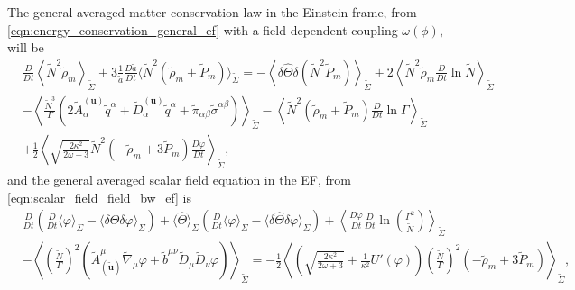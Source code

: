 The general averaged matter conservation law in the Einstein frame, from \cref{eqn:energy_conservation_general_ef} with a field dependent coupling $\omega(\phi)$, will be
\begin{align}
    &\frac{D}{Dt}\left\langle \tilde{N}^2\tilde{\rho}_m\right\rangle_{\tilde{\Sigma}}+3\frac{1}{\tilde{a}}\frac{D\tilde{a}}{Dt}\langle \tilde{N}^2(\tilde{\rho}_m+\tilde{P}_m)\rangle_{\tilde{\Sigma}}=-\left\langle\delta\hat{\Theta}\delta(\tilde{N}^2\tilde{P}_m)\right\rangle_{\tilde{\Sigma}}+2\left\langle \tilde{N}^2\tilde{\rho}_m \frac{D}{Dt}\ln\tilde{N}\right\rangle_{\tilde{\Sigma}}\nonumber\\
    &-\left\langle \frac{\tilde{N}^3}{\Gamma}\left(2\tilde{A}^{(\mathbf{u})}_\alpha \tilde{q}^\alpha+\tilde{D}^{(\mathbf{u})}_\alpha \tilde{q}^\alpha+\tilde{\pi}_{\alpha\beta}\tilde{\sigma}^{\alpha\beta}\right)\right\rangle_{\tilde{\Sigma}}-\left\langle\tilde{N}^2(\tilde{\rho}_m+\tilde{P}_m)\frac{D}{Dt}\ln\Gamma\right\rangle_{\tilde{\Sigma}}\nonumber\\
    &+\frac{1}{2}\left\langle \sqrt{\frac{2\kappa^2}{2\omega+3}}\tilde{N}^2(-\tilde{\rho}_m+3\tilde{P}_m)\frac{D\varphi}{Dt}\right\rangle_{\tilde{\Sigma}},
    \label{eqn:energy_conservation_general_bw_ef}
\end{align}
and the general averaged scalar field equation in the EF, from \cref{eqn:scalar_field_field_bw_ef} is
\begin{align}
    &\frac{D}{Dt}\left(\frac{D}{Dt}\langle\varphi\rangle_{\tilde{\Sigma}}-\langle\delta\hat{\Theta}\delta\varphi\rangle_{\tilde{\Sigma}}\right)+\langle\hat{\Theta}\rangle_{\tilde{\Sigma}} \left(\frac{D}{Dt}\langle\varphi\rangle_{\tilde{\Sigma}}-\langle\delta\hat{\Theta}\delta\varphi\rangle_{\tilde{\Sigma}}\right) +\left\langle\frac{D\varphi}{Dt}\frac{D}{Dt}\ln\left(\frac{\Gamma^2}{\tilde{N}}\right)\right\rangle_{\tilde{\Sigma}}\\
    &-\left\langle\left(\frac{\tilde{N}}{\Gamma}\right)^2\left(\tilde{A}^\mu_{(\mathbf{\tilde{u}})} \tilde{\nabla}_\mu\varphi+\tilde{b}^{\mu\nu}\tilde{D}_\mu\tilde{D}_\nu \varphi\right) \right\rangle_{\tilde{\Sigma}}=-\frac{1}{2}\left\langle\left(\sqrt{\frac{2\kappa^2}{2\omega+3}}+\frac{1}{\kappa^2}U'(\varphi)\right)\left(\frac{\tilde{N}}{\Gamma}\right)^2(-\tilde{\rho}_m+3\tilde{P}_m)\right\rangle_{\tilde{\Sigma}},\nonumber
    \label{eqn:scalar_field_motion_general_bw_ef}
\end{align}




